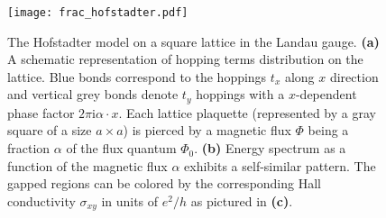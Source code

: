 \begin{figure}
\centering
\texttt{[image: frac\_hofstadter.pdf]}
\caption[The Hofstadter model on a square lattice]{The Hofstadter model on a square lattice in the Landau gauge. \textbf{(a)} A schematic representation of hopping terms distribution on the lattice. Blue bonds correspond to the hoppings $t_x$ along $x$ direction and vertical grey bonds denote $t_y$ hoppings with a $x$-dependent phase factor $2 \pi \mathrm{i} \alpha \cdot x$. Each lattice plaquette (represented by a gray square of a size $a \times a$) is pierced by a magnetic flux $\Phi$ being a fraction $\alpha$ of the flux quantum $\Phi_0$. \textbf{(b)} Energy spectrum as a function of the magnetic flux $\alpha$ exhibits a self-similar pattern. The gapped regions can be colored by the corresponding Hall conductivity $\sigma_{xy}$ in units of $e^2 / h$ as pictured in \textbf{(c)}.}
\label{fig:square_hofstadter}
\end{figure}
 
